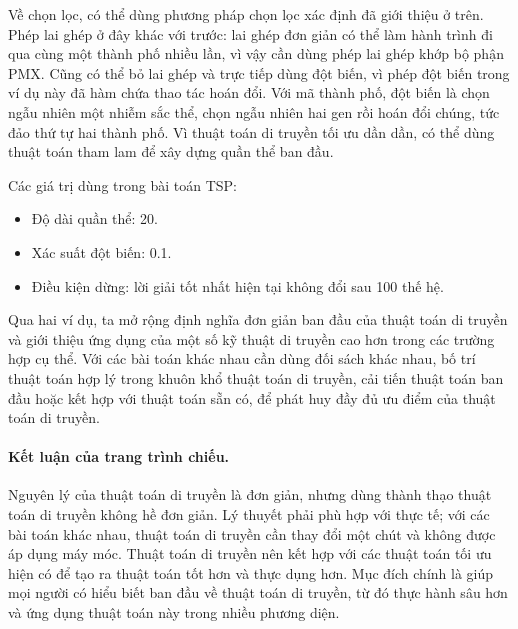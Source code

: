 \documentclass[11pt]{article}
\begin{document}
Về chọn lọc, có thể dùng phương pháp chọn lọc xác định đã giới thiệu ở trên.
Phép lai ghép ở đây khác với trước: lai ghép đơn giản có thể làm hành trình
đi qua cùng một thành phố nhiều lần, vì vậy cần dùng phép lai ghép khớp bộ
phận PMX. Cũng có thể bỏ lai ghép và trực tiếp dùng đột biến, vì phép đột
biến trong ví dụ này đã hàm chứa thao tác hoán đổi. Với mã thành phố, đột
biến là chọn ngẫu nhiên một nhiễm sắc thể, chọn ngẫu nhiên hai gen rồi hoán
đổi chúng, tức đảo thứ tự hai thành phố. Vì thuật toán di truyền tối ưu dần
dần, có thể dùng thuật toán tham lam để xây dựng quần thể ban đầu.

Các giá trị dùng trong bài toán TSP:
\begin{itemize}
  \item Độ dài quần thể: 20.
  \item Xác suất đột biến: 0.1.
  \item Điều kiện dừng: lời giải tốt nhất hiện tại không đổi sau 100 thế hệ.
\end{itemize}

Qua hai ví dụ, ta mở rộng định nghĩa đơn giản ban đầu của thuật toán di
truyền và giới thiệu ứng dụng của một số kỹ thuật di truyền cao hơn trong các
trường hợp cụ thể. Với các bài toán khác nhau cần dùng đối sách khác nhau,
bố trí thuật toán hợp lý trong khuôn khổ thuật toán di truyền, cải tiến thuật
toán ban đầu hoặc kết hợp với thuật toán sẵn có, để phát huy đầy đủ ưu điểm
của thuật toán di truyền.

\paragraph{Kết luận của trang trình chiếu.}
Nguyên lý của thuật toán di truyền là đơn giản, nhưng dùng thành thạo thuật
toán di truyền không hề đơn giản. Lý thuyết phải phù hợp với thực tế; với các
bài toán khác nhau, thuật toán di truyền cần thay đổi một chút và không được
áp dụng máy móc. Thuật toán di truyền nên kết hợp với các thuật toán tối ưu
hiện có để tạo ra thuật toán tốt hơn và thực dụng hơn. Mục đích chính là giúp
mọi người có hiểu biết ban đầu về thuật toán di truyền, từ đó thực hành sâu
hơn và ứng dụng thuật toán này trong nhiều phương diện.
\end{document}

